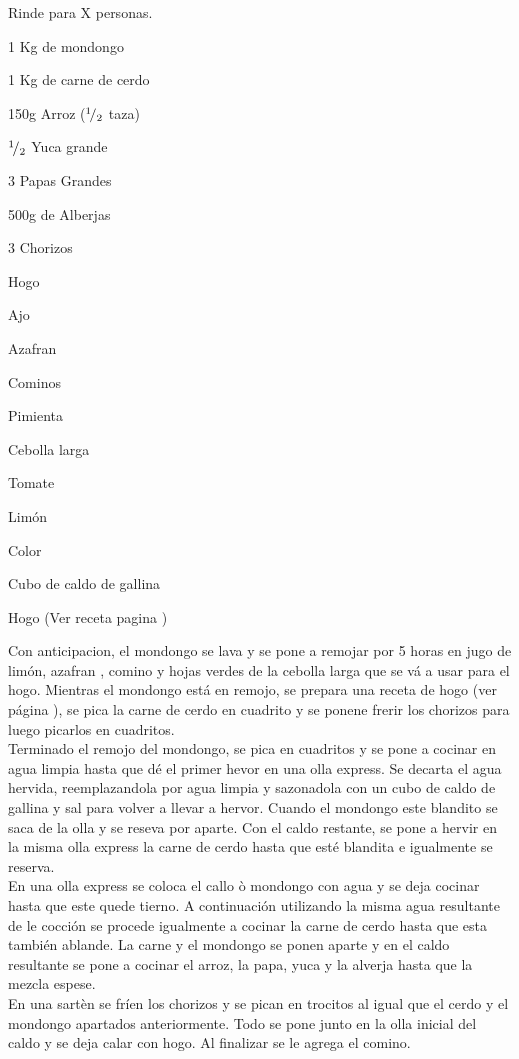 
Rinde para X personas.

\begin{ingredientes}
\item 1 Kg de mondongo
\item 1 Kg de carne de cerdo
\item 150g Arroz (${}^{1}\!/_{2}$ taza)
\item ${}^{1}\!/_{2}$ Yuca grande
\item 3 Papas Grandes
\item 500g de Alberjas
\item 3 Chorizos
\item Hogo
\item Ajo
\item Azafran
\item Cominos
\item Pimienta
\item Cebolla larga
\item Tomate
\item Limón
\item Color
\item Cubo de caldo de gallina
\item Hogo (Ver receta pagina \pageref{hogo})
\end{ingredientes}
\preparacion
Con anticipacion, el mondongo se lava y se pone a remojar por 5 horas en jugo de limón, azafran , comino y hojas verdes de la cebolla larga que se vá a usar para el hogo. Mientras el mondongo está en remojo, se prepara una receta de hogo (ver página \pageref{hogo}), se pica la carne de cerdo en cuadrito y se ponene frerir los chorizos para luego picarlos en cuadritos.\\

Terminado el remojo del mondongo, se pica en cuadritos y se pone a cocinar en agua limpia hasta que dé el primer hevor en una olla express. Se decarta el agua hervida, reemplazandola por agua limpia y sazonadola con un cubo de caldo de gallina y sal para volver a llevar a hervor. Cuando el mondongo este blandito se saca de la olla y se reseva por aparte. Con el caldo restante, se pone a hervir en la misma olla express la carne de cerdo hasta que esté blandita e igualmente se reserva.\\

En una olla express se coloca el callo ò mondongo con agua y se deja cocinar hasta que este quede tierno. A continuación utilizando la misma agua resultante de le cocción se procede igualmente a cocinar la carne de cerdo hasta que esta también ablande. La carne y el mondongo se ponen aparte y en el caldo resultante se pone a cocinar el arroz, la papa, yuca y la alverja hasta que la mezcla espese.\\

En una sartèn se fríen los chorizos y se pican en trocitos al igual que el cerdo y el mondongo apartados anteriormente. Todo se pone junto en la olla inicial del caldo y se deja calar con hogo. Al finalizar se le agrega el comino.